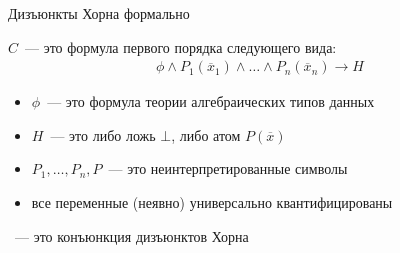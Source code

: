 
\begin{frame}{Дизъюнкты Хорна формально}
\begin{block}{}
 $C$~--- это формула первого порядка следующего вида:
\vspace*{10pt}
\begin{align*}
\phi\land P_1(\overline{x}_1)\land\ldots\land P_n(\overline{x}_n) \rightarrow H
\end{align*}
\vspace*{-20pt}
\begin{itemize}
    \item {} $\phi$~--- это формула теории алгебраических типов данных
    \item {} $H$~--- это либо ложь $\bot$, либо атом $P(\overline{x})$
    \item $P_1,\ldots,P_n, P$~--- это неинтерпретированные символы
    \item все переменные (неявно) универсально квантифицированы
\end{itemize}
~--- это конъюнкция дизъюнктов Хорна
\end{block}
\end{frame}


